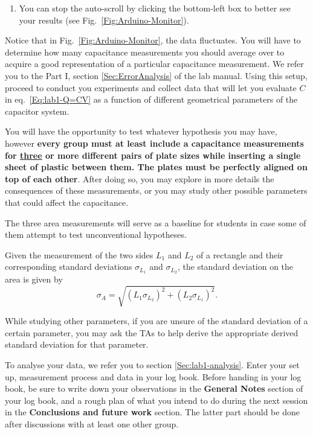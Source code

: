 \documentclass[12pt]{report}
\begin{document}
\begin{enumerate}
\item You can stop the auto-scroll by clicking the bottom-left box to better see your results (see Fig.~\ref{Fig:Arduino-Monitor}).
\end{enumerate}

Notice that in Fig.~\ref{Fig:Arduino-Monitor}, the data fluctuates. You will have to determine how many capacitance measurements  you should average over to acquire a good representation of a particular capacitance measurement. 
We refer you to the Part I, section \ref{Sec:ErrorAnalysis} of the lab manual. Using this setup, proceed to conduct you experiments and collect data that will let you evaluate $C$ in eq.~\eqref{Eq:lab1-Q=CV} as a function of different geometrical parameters of the capacitor system. 

You will have the opportunity to test whatever hypothesis you may have, however {\color{blue} \textbf{every group must at least include a capacitance measurements for \underline{three} or more different pairs of plate sizes while inserting a single sheet of plastic between them. 
The plates must be perfectly aligned on top of each other}.} After doing so, you may explore in more details the consequences of these measurements, or you may study other possible parameters that could affect the capacitance.

\begin{tcolorbox}
The three area measurements will serve as a baseline for students in case some of them attempt to test unconventional hypotheses. 
\end{tcolorbox}

Given the measurement of the two sides $L_1$ and $L_2$ of a rectangle and their corresponding standard deviations $\sigma_{L_1}$ and $\sigma_{L_2}$, the standard deviation on the area is given by
\begin{equation}
\sigma_A = \sqrt{ \left( L_1 \sigma_{L_2} \right)^2 + \left( L_2 \sigma_{L_1} \right)^2 }.
\end{equation}

While studying other parameters, if you are unsure of the standard deviation of a certain parameter, you may ask the TAs to help derive the appropriate derived standard deviation for that parameter.

To analyse your data, we refer you to section \ref{Sec:lab1-analysis}.
{\color{blue}Enter your set up, measurement process and data in your log book.} Before handing in your log book, be sure to write down your {\color{blue}observations in the \textbf{General Notes} section of your log book, and a rough plan of what you intend to do during the next session in the \textbf{Conclusions and future work} section}. The latter part should be done after discussions with at least one other group.
\end{document}
